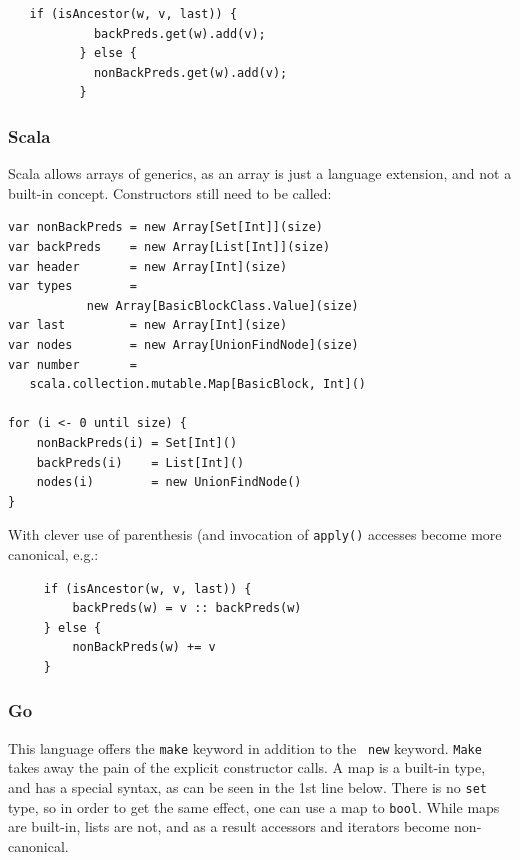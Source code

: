 \begin{footnotesize}
\begin{verbatim}
   if (isAncestor(w, v, last)) {
            backPreds.get(w).add(v);
          } else {
            nonBackPreds.get(w).add(v);
          }
\end{verbatim}
\end{footnotesize}


\subsubsection{Scala}

Scala allows arrays of generics, as an array is just a language
extension, and not a built-in concept. Constructors still need to be
called:

\begin{footnotesize}
\begin{verbatim}
var nonBackPreds = new Array[Set[Int]](size)
var backPreds    = new Array[List[Int]](size)
var header       = new Array[Int](size)
var types        = 
           new Array[BasicBlockClass.Value](size)
var last         = new Array[Int](size)
var nodes        = new Array[UnionFindNode](size)
var number       = 
   scala.collection.mutable.Map[BasicBlock, Int]()

for (i <- 0 until size) {
    nonBackPreds(i) = Set[Int]()
    backPreds(i)    = List[Int]()
    nodes(i)        = new UnionFindNode()
}
\end{verbatim}
\end{footnotesize}

With clever use of parenthesis (and invocation of {\tt apply()}
accesses become more canonical, e.g.:


\begin{footnotesize}
\begin{verbatim}
     if (isAncestor(w, v, last)) {
         backPreds(w) = v :: backPreds(w)
     } else {
         nonBackPreds(w) += v
     }
\end{verbatim}
\end{footnotesize}

\subsubsection{Go}

This language offers the {\tt make} keyword in addition to the {\tt
  new} keyword.  {\tt Make} takes away the pain of the explicit
constructor calls. A map is a built-in type, and has a special syntax,
as can be seen in the 1st line below. There is no {\tt set} type, so in
order to get the same effect, one can use a map to {\tt bool}. While
maps are built-in, lists are not, and as a result accessors and
iterators become non-canonical.

